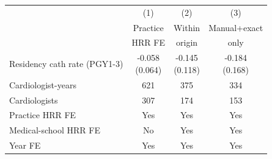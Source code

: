 \begin{tabular}{lccc}
\toprule
 & (1) & (2) & (3) \\
 & Practice & Within & Manual+exact \\
 & HRR FE & origin & only \\
\midrule
Residency cath rate (PGY1-3) & \shortstack[c]{-0.058 \\ (0.064)} & \shortstack[c]{-0.145 \\ (0.118)} & \shortstack[c]{-0.184 \\ (0.168)} \\
\midrule
Cardiologist-years & 621 & 375 & 334 \\
Cardiologists & 307 & 174 & 153 \\
Practice HRR FE & Yes & Yes & Yes \\
Medical-school HRR FE & No & Yes & Yes \\
Year FE & Yes & Yes & Yes \\
\bottomrule
\end{tabular}

